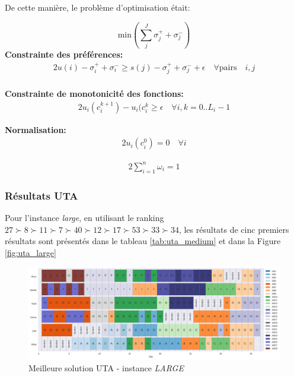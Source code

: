 \documentclass[12pt, a4paper, french, version=last, parskip=half, titlepage]{scrartcl}
\begin{document}
\begin{tcolorbox}

De cette manière, le problème d'optimisation était: 

\begin{equation*}
    \text{min} (\sum_j^J \sigma_j^+ + \sigma_j^-)
\end{equation*}
\textbf{Constrainte des préférences:}
\begin{alignat*}{2}
    u(i) - \sigma_i^+ + \sigma_i^- \ge s(j) - \sigma_j^+ + \sigma_j^- + \epsilon \quad \forall \text{pairs} \quad i, j \\  
\end{alignat*}

\textbf{Constrainte de monotonicité des fonctions:}
\begin{alignat*}{2}
    u_i(c_i^{k+1}) - u_i(c_i^k \ge \epsilon  \quad \forall i, k = 0 .. L_i - 1
\end{alignat*}

\textbf{Normalisation:}
\begin{alignat*}{2}
    u_i(c_i^{0})  = 0 \quad \forall i
\end{alignat*}

\begin{alignat*}{2}
  \sum_{i=1}^n \omega_i = 1 
\end{alignat*}

\end{tcolorbox}

\subsubsection{Résultats UTA}

Pour l'instance \emph{large}, en utilisant le ranking $27 \succ 8 \succ 11 \succ 7 \succ 40 \succ 12 \succ 17 \succ 53 \succ 33 \succ 34$, les résultats de cinc premiers résultats sont présentés dans le tableau \ref{tab:uta_medium} et dans la Figure \ref{fig:uta_large}

\begin{figure}[h]
\centering
\includegraphics[width=1\textwidth]{images/best_uta_large.png}
\caption{Meilleure solution UTA - instance \emph{LARGE}}
\label{fig:uta_large_best}
\end{figure}    
\end{document}

